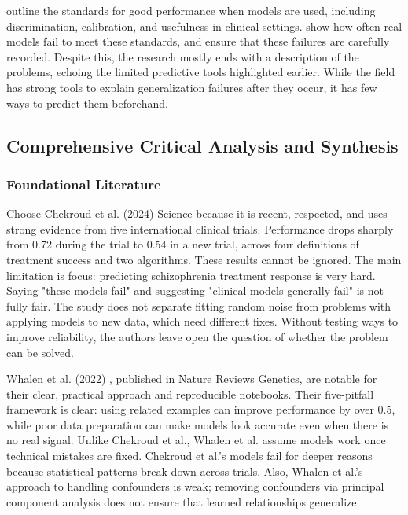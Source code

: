 \cite{steyerberg2010assessing} outline the standards for good performance when models are used, including discrimination, calibration, and usefulness in clinical settings. \cite{chekroud2024illusory} show how often real models fail to meet these standards, and \cite{collins2024tripod} ensure that these failures are carefully recorded. Despite this, the research mostly ends with a description of the problems, echoing the limited predictive tools highlighted earlier. While the field has strong tools to explain generalization failures after they occur, it has few ways to predict them beforehand.

\subsection{Comprehensive Critical Analysis and Synthesis}

\subsubsection{Foundational Literature}

Choose Chekroud et al. (2024) \cite{chekroud2024illusory} Science because it is recent, respected, and uses strong evidence from five international clinical trials. Performance drops sharply from 0.72 during the trial to 0.54 in a new trial, across four definitions of treatment success and two algorithms. These results cannot be ignored. The main limitation is focus: predicting schizophrenia treatment response is very hard. Saying "these models fail" and suggesting "clinical models generally fail" is not fully fair. The study does not separate fitting random noise from problems with applying models to new data, which need different fixes. Without testing ways to improve reliability, the authors leave open the question of whether the problem can be solved.

Whalen et al. (2022) \cite{whalen2022pitfalls}, published in Nature Reviews Genetics, are notable for their clear, practical approach and reproducible notebooks. Their five-pitfall framework is clear: using related examples can improve performance by over 0.5, while poor data preparation can make models look accurate even when there is no real signal. Unlike Chekroud et al., Whalen et al. assume models work once technical mistakes are fixed. Chekroud et al.'s models fail for deeper reasons because statistical patterns break down across trials. Also, Whalen et al.'s approach to handling confounders is weak; removing confounders via principal component analysis does not ensure that learned relationships generalize.

